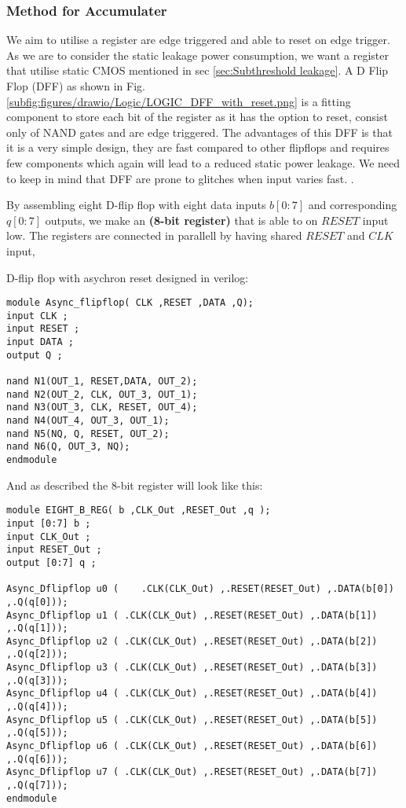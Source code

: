 \subsubsection{Method for Accumulater}
We aim to utilise a register are edge triggered and able to reset on edge trigger. As we are to consider the static leakage power consumption, we want a register that utilise static CMOS mentioned in sec \ref{sec:Subthreshold leakage}. A D Flip Flop (DFF) as shown in Fig. \ref{subfig:figures/drawio/Logic/LOGIC_DFF_with_reset.png} is a fitting component to store each bit of the register as it has the option to reset, consist only of NAND gates and are edge triggered. The advantages of this DFF is that it is a very simple design, they are fast compared to other flipflops and requires few components which again will lead to a reduced static power leakage. We need to keep in mind that DFF are prone to glitches when input varies fast. \cite{a2023_d}.

By assembling eight D-flip flop with eight data inputs $b[0:7]$ and corresponding $q[0:7]$ outputs, we make an \textbf{(8-bit register)} that is able to on $RESET$ input low. The registers are connected in parallell by having shared $RESET$ and $CLK$ input,


D-flip flop with asychron reset designed in verilog:
\begin{lstlisting}
module Async_flipflop( CLK ,RESET ,DATA ,Q);
input CLK ;
input RESET ;
input DATA ;
output Q ;

nand N1(OUT_1, RESET,DATA, OUT_2);
nand N2(OUT_2, CLK, OUT_3, OUT_1);
nand N3(OUT_3, CLK, RESET, OUT_4);
nand N4(OUT_4, OUT_3, OUT_1);
nand N5(NQ, Q, RESET, OUT_2);
nand N6(Q, OUT_3, NQ);
endmodule
\end{lstlisting}
And as described the 8-bit register will look like this:

\begin{lstlisting}
module EIGHT_B_REG( b ,CLK_Out ,RESET_Out ,q );
input [0:7] b ;
input CLK_Out ;
input RESET_Out ;
output [0:7] q ;

Async_Dflipflop u0 (	.CLK(CLK_Out) ,.RESET(RESET_Out) ,.DATA(b[0]) ,.Q(q[0])); 
Async_Dflipflop u1 ( .CLK(CLK_Out) ,.RESET(RESET_Out) ,.DATA(b[1]) ,.Q(q[1]));
Async_Dflipflop u2 ( .CLK(CLK_Out) ,.RESET(RESET_Out) ,.DATA(b[2]) ,.Q(q[2]));
Async_Dflipflop u3 ( .CLK(CLK_Out) ,.RESET(RESET_Out) ,.DATA(b[3]) ,.Q(q[3]));
Async_Dflipflop u4 ( .CLK(CLK_Out) ,.RESET(RESET_Out) ,.DATA(b[4]) ,.Q(q[4]));
Async_Dflipflop u5 ( .CLK(CLK_Out) ,.RESET(RESET_Out) ,.DATA(b[5]) ,.Q(q[5]));
Async_Dflipflop u6 ( .CLK(CLK_Out) ,.RESET(RESET_Out) ,.DATA(b[6]) ,.Q(q[6]));
Async_Dflipflop u7 ( .CLK(CLK_Out) ,.RESET(RESET_Out) ,.DATA(b[7]) ,.Q(q[7]));
endmodule
\end{lstlisting}

